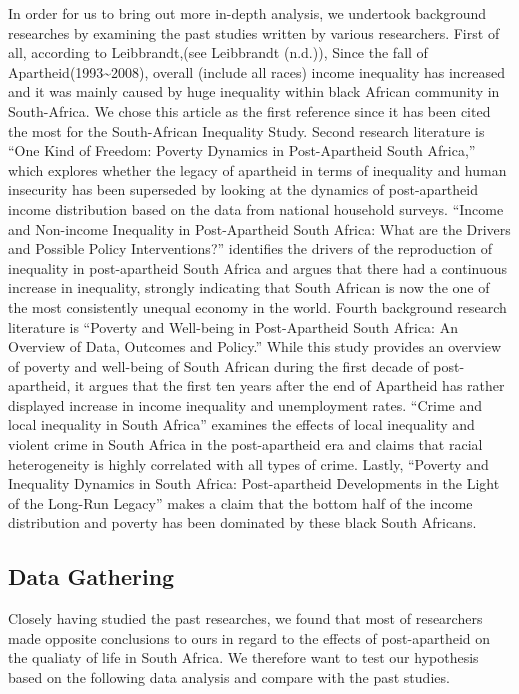 \documentclass[]{article}
\begin{document}
In order for us to bring out more in-depth analysis, we undertook
background researches by examining the past studies written by various
researchers. First of all, according to Leibbrandt,(see Leibbrandt
(n.d.)), Since the fall of Apartheid(1993\textasciitilde{}2008), overall
(include all races) income inequality has increased and it was mainly
caused by huge inequality within black African community in
South-Africa. We chose this article as the first reference since it has
been cited the most for the South-African Inequality Study. Second
research literature is ``One Kind of Freedom: Poverty Dynamics in
Post-Apartheid South Africa,'' which explores whether the legacy of
apartheid in terms of inequality and human insecurity has been
superseded by looking at the dynamics of post-apartheid income
distribution based on the data from national household surveys. ``Income
and Non-income Inequality in Post-Apartheid South Africa: What are the
Drivers and Possible Policy Interventions?'' identifies the drivers of
the reproduction of inequality in post-apartheid South Africa and argues
that there had a continuous increase in inequality, strongly indicating
that South African is now the one of the most consistently unequal
economy in the world. Fourth background research literature is ``Poverty
and Well-being in Post-Apartheid South Africa: An Overview of Data,
Outcomes and Policy.'' While this study provides an overview of poverty
and well-being of South African during the first decade of
post-apartheid, it argues that the first ten years after the end of
Apartheid has rather displayed increase in income inequality and
unemployment rates. ``Crime and local inequality in South Africa''
examines the effects of local inequality and violent crime in South
Africa in the post-apartheid era and claims that racial heterogeneity is
highly correlated with all types of crime. Lastly, ``Poverty and
Inequality Dynamics in South Africa: Post-apartheid Developments in the
Light of the Long-Run Legacy'' makes a claim that the bottom half of the
income distribution and poverty has been dominated by these black South
Africans.

\subsection{Data Gathering}\label{data-gathering}

Closely having studied the past researches, we found that most of
researchers made opposite conclusions to ours in regard to the effects
of post-apartheid on the qualiaty of life in South Africa. We therefore
want to test our hypothesis based on the following data analysis and
compare with the past studies.
\end{document}
